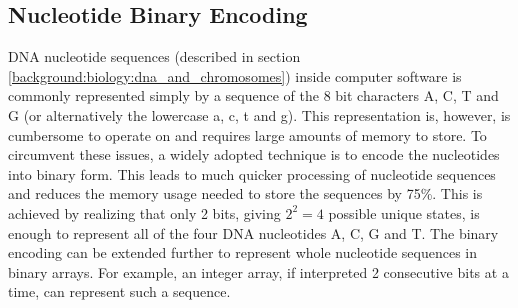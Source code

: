 \subsection{Nucleotide Binary Encoding} \label{background:nucleotide_binary_encoding}

DNA nucleotide sequences (described in section \ref{background:biology:dna_and_chromosomes}) inside computer software is commonly represented simply by a sequence of the 8 bit characters A, C, T and G (or alternatively the lowercase a, c, t and g).
This representation is, however, is cumbersome to operate on and requires large amounts of memory to store.
To circumvent these issues, a widely adopted technique is to encode the nucleotides into binary form.
This leads to much quicker processing of nucleotide sequences and reduces the memory usage needed to store the sequences by 75\%.
This is achieved by realizing that only 2 bits, giving \textit{$2^2=4$} possible unique states, is enough to represent all of the four DNA nucleotides A, C, G and T.
The binary encoding can be extended further to represent whole nucleotide sequences in binary arrays.
For example, an integer array, if interpreted 2 consecutive bits at a time, can represent such a sequence.

